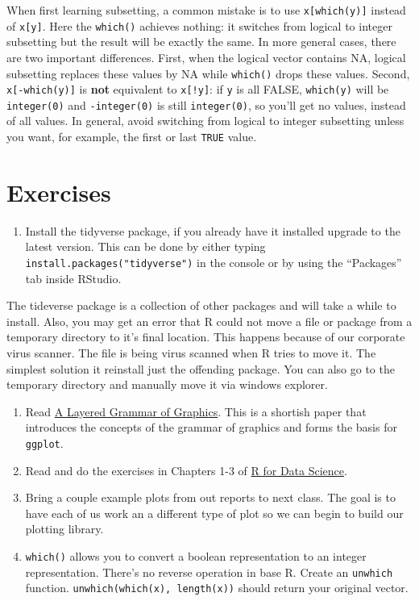 \documentclass[]{book}
\providecommand{\tightlist}{%
  \setlength{\itemsep}{0pt}\setlength{\parskip}{0pt}}
\theoremstyle{definition}
\theoremstyle{definition}
\theoremstyle{definition}
\theoremstyle{remark}
\begin{document}
When first learning subsetting, a common mistake is to use
\texttt{x{[}which(y){]}} instead of \texttt{x{[}y{]}}. Here the
\texttt{which()} achieves nothing: it switches from logical to integer
subsetting but the result will be exactly the same. In more general
cases, there are two important differences. First, when the logical
vector contains NA, logical subsetting replaces these values by NA while
\texttt{which()} drops these values. Second, \texttt{x{[}-which(y){]}}
is \textbf{not} equivalent to \texttt{x{[}!y{]}}: if \texttt{y} is all
FALSE, \texttt{which(y)} will be \texttt{integer(0)} and
\texttt{-integer(0)} is still \texttt{integer(0)}, so you'll get no
values, instead of all values. In general, avoid switching from logical
to integer subsetting unless you want, for example, the first or last
\texttt{TRUE} value.

\hypertarget{exercises-2}{%
\section{Exercises}\label{exercises-2}}

\begin{enumerate}
\def\labelenumi{\arabic{enumi}.}
\tightlist
\item
  Install the tidyverse package, if you already have it installed
  upgrade to the latest version. This can be done by either typing
  \texttt{install.packages("tidyverse")} in the console or by using the
  ``Packages'' tab inside RStudio.
\end{enumerate}

The tideverse package is a collection of other packages and will take a
while to install. Also, you may get an error that R could not move a
file or package from a temporary directory to it's final location. This
happens because of our corporate virus scanner. The file is being virus
scanned when R tries to move it. The simplest solution it reinstall just
the offending package. You can also go to the temporary directory and
manually move it via windows explorer.

\begin{enumerate}
\def\labelenumi{\arabic{enumi}.}
\setcounter{enumi}{1}
\item
  Read \href{http://vita.had.co.nz/papers/layered-grammar.pdf}{A Layered
  Grammar of Graphics}. This is a shortish paper that introduces the
  concepts of the grammar of graphics and forms the basis for
  \texttt{ggplot}.
\item
  Read and do the exercises in Chapters 1-3 of
  \href{http://r4ds.had.co.nz/}{R for Data Science}.
\item
  Bring a couple example plots from out reports to next class. The goal
  is to have each of us work an a different type of plot so we can begin
  to build our plotting library.
\item
  \texttt{which()} allows you to convert a boolean representation to an
  integer representation. There's no reverse operation in base R. Create
  an \texttt{unwhich} function. \texttt{unwhich(which(x),\ length(x))}
  should return your original vector.
\end{enumerate}
\end{document}

